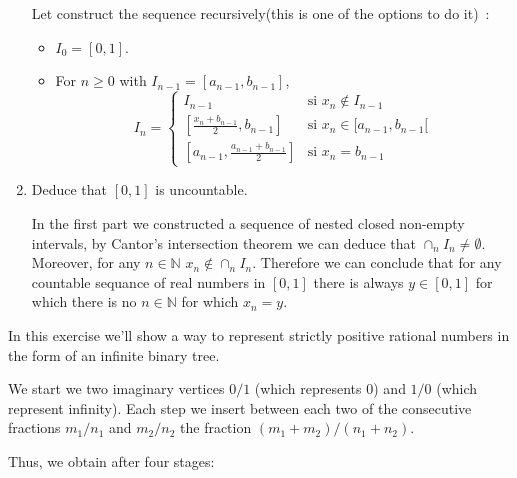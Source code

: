\documentclass[a4paper,11pt]{exam}
\newcommand{\N}{\mathbb{N}}
\begin{document}
\begin{questions}
\begin{enumerate}
 	\begin{solution}
 		Let construct the sequence recursively(this is one of the options to do it)~:
 		\begin{itemize}
 			\item $I_{0} = [0,1]$.
 			\item  For $n \geq 0$ with $I_{n-1} = [a_{n-1}, b_{n-1}]$,
 			\[
 			I_n = \left\{
 			\begin{array}{ll}
 			I_{n-1} & \text{si } x_n \notin I_{n-1} \\
 			{}[\frac{x_n+b_{n-1}}{2},b_{n-1}] & \text{si } x_n \in
 			[a_{n-1}, b_{n-1}[ \\
 			{}[a_{n-1},\frac{a_{n-1}+b_{n-1}}{2}] & \text{si }
 			x_n=b_{n-1}
 			\end{array}
 			\right.
 			\]
 		\end{itemize}
 	\end{solution}
 	
 	\item Deduce that $ [0,1] $ is uncountable.
 	
 	\begin{solution}
 		In the first part we constructed a sequence of nested closed non-empty intervals, by Cantor's intersection theorem we can deduce that $\cap_n I_n\neq \emptyset$. Moreover, for any $n\in\N$ $x_n\notin \cap_n I_n$. Therefore we can conclude that for any countable sequance of real  numbers in $[0,1]$ there is always $y\in[0,1]$ for which there is no $n\in\N$ for which $x_n = y$.
 	\end{solution}
 \end{enumerate}

In this exercise we'll show a way to represent strictly positive rational numbers in the form of an infinite binary tree.

We start we two imaginary vertices $0/1$ (which represents $0$) and $1/0$ (which represent infinity).
Each step we insert between each two of the consecutive fractions $m_1/n_1$ and $m_2/n_2$ the fraction ${(m_1+m_2)/(n_1+n_2)}$.

Thus, we obtain after four stages:



\end{questions}
\end{document}

